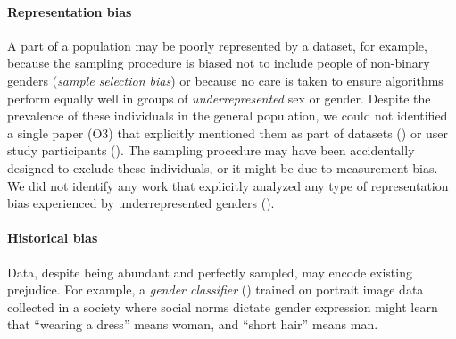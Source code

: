 \documentclass[nonacm,sigconf,review,balance=false]{acmart}
\begin{document}
\paragraph*{Representation bias} A part of a population may be poorly represented by a dataset, for example, because the sampling procedure is biased not to include people of non-binary genders (\emph{sample selection bias}) or because no care is taken to ensure algorithms perform equally well in  groups of \emph{underrepresented} sex or gender. Despite the prevalence of these individuals in the general population, we could not identified a single paper (O3) that explicitly mentioned them as part of datasets (\dataset) or user study participants (\userstudy). The sampling procedure may have been accidentally designed to exclude these individuals, or it might be due to measurement bias. We did not identify any work that explicitly analyzed any type of representation bias experienced by underrepresented genders (\binary).

\paragraph*{Historical bias} Data, despite being abundant and perfectly sampled, may encode existing prejudice. For example, a \emph{gender classifier} (\classifier) trained on portrait image data collected in a society where social norms dictate gender expression might learn that ``wearing a dress'' means woman, and ``short hair'' means man.
\end{document}
